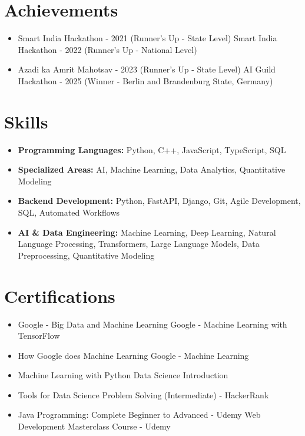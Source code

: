 \documentclass[a4paper,10pt]{article}
\begin{document}
\section*{Achievements}
\begin{itemize}
\item Smart India Hackathon - 2021 (Runner's Up - State Level) \hfill Smart India Hackathon - 2022 (Runner's Up - National Level)
\item Azadi ka Amrit Mahotsav - 2023 (Runner's Up - State Level) \hfill AI Guild Hackathon - 2025 (Winner - Berlin and Brandenburg State, Germany)
\end{itemize}

\section*{Skills}
\begin{itemize}
  \item \textbf{Programming Languages:} Python, C++, JavaScript, TypeScript, SQL
  \item \textbf{Specialized Areas:} AI, Machine Learning, Data Analytics, Quantitative Modeling
  \item \textbf{Backend Development:} Python, FastAPI, Django, Git, Agile Development, SQL, Automated Workflows
  \item \textbf{AI \& Data Engineering:} Machine Learning, Deep Learning, Natural Language Processing, Transformers, Large Language Models, Data Preprocessing, Quantitative Modeling
\end{itemize}

\section*{Certifications}
\begin{itemize}
\item Google - Big Data and Machine Learning \hfill Google - Machine Learning with TensorFlow
\item How Google does Machine Learning \hfill Google - Machine Learning
\item Machine Learning with Python \hfill Data Science Introduction
\item Tools for Data Science \hfill Problem Solving (Intermediate) - HackerRank
\item Java Programming: Complete Beginner to Advanced - Udemy \hfill Web Development Masterclass Course - Udemy
\end{itemize}
\end{document}
